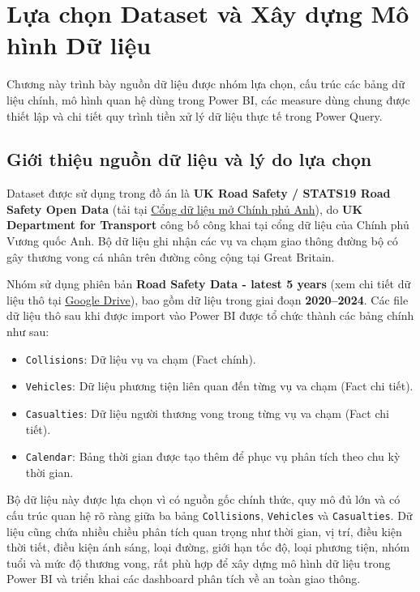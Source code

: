 \section{Lựa chọn Dataset và Xây dựng Mô hình Dữ liệu}
\label{sec:data_model}

Chương này trình bày nguồn dữ liệu được nhóm lựa chọn, cấu trúc các bảng dữ liệu chính, mô hình quan hệ dùng trong Power BI, các measure dùng chung được thiết lập và chi tiết quy trình tiền xử lý dữ liệu thực tế trong Power Query.

\subsection{Giới thiệu nguồn dữ liệu và lý do lựa chọn}

Dataset được sử dụng trong đồ án là \textbf{UK Road Safety / STATS19 Road Safety Open Data} (tải tại \href{https://www.data.gov.uk/dataset/cb7ae6f0-4be6-4935-9277-47e5ce24a11f/road-accidents-safety-data}{Cổng dữ liệu mở Chính phủ Anh}), do \textbf{UK Department for Transport} công bố công khai tại cổng dữ liệu của Chính phủ Vương quốc Anh. Bộ dữ liệu ghi nhận các vụ va chạm giao thông đường bộ có gây thương vong cá nhân trên đường công cộng tại Great Britain.

Nhóm sử dụng phiên bản \textbf{Road Safety Data - latest 5 years} (xem chi tiết dữ liệu thô tại \href{https://drive.google.com/drive/folders/1nHXy3pHXzv50jblpyR1beulpuRSs6aUt?usp=drive_link}{Google Drive}), bao gồm dữ liệu trong giai đoạn \textbf{2020--2024}. Các file dữ liệu thô sau khi được import vào Power BI được tổ chức thành các bảng chính như sau:

\begin{itemize}
    \item \texttt{Collisions}: Dữ liệu vụ va chạm (Fact chính).
    \item \texttt{Vehicles}: Dữ liệu phương tiện liên quan đến từng vụ va chạm (Fact chi tiết).
    \item \texttt{Casualties}: Dữ liệu người thương vong trong từng vụ va chạm (Fact chi tiết).
    \item \texttt{Calendar}: Bảng thời gian được tạo thêm để phục vụ phân tích theo chu kỳ thời gian.
\end{itemize}

Bộ dữ liệu này được lựa chọn vì có nguồn gốc chính thức, quy mô đủ lớn và có cấu trúc quan hệ rõ ràng giữa ba bảng \texttt{Collisions}, \texttt{Vehicles} và \texttt{Casualties}. Dữ liệu cũng chứa nhiều chiều phân tích quan trọng như thời gian, vị trí, điều kiện thời tiết, điều kiện ánh sáng, loại đường, giới hạn tốc độ, loại phương tiện, nhóm tuổi và mức độ thương vong, rất phù hợp để xây dựng mô hình dữ liệu trong Power BI và triển khai các dashboard phân tích về an toàn giao thông.

